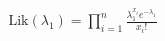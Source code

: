 \documentclass[preview]{standalone}
\begin{document}
\begin{align*}
\text{Lik}(\lambda_1) = \prod_{i=1}^n \frac{\lambda_1^{x_i} e^{-\lambda_1}}{x_i!}
\end{align*}
\end{document}
